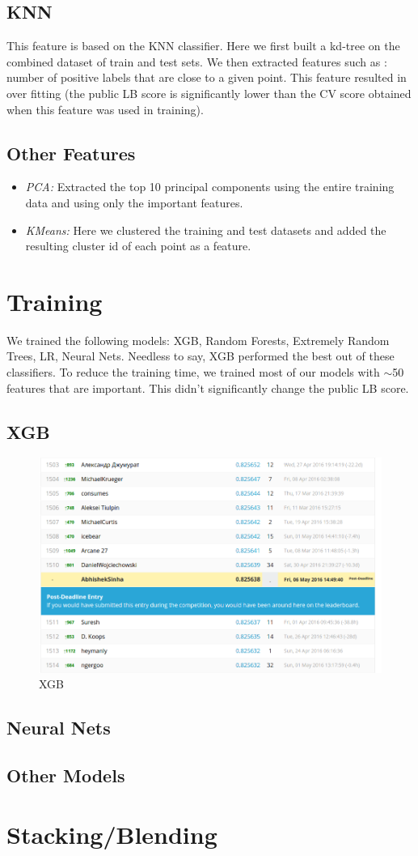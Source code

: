 \documentclass{article}
\begin{document}
\subsection{KNN}
This feature is based on the KNN classifier. Here we first built a kd-tree on the combined dataset of train and test sets. We then
extracted features such as : number of positive labels that are close to a given point. This feature resulted in over fitting (the public LB score is significantly lower than the CV score obtained when this feature was used in training).
\subsection{Other Features}
\begin{itemize}
\item \textit{PCA:} Extracted the top 10 principal components using the entire training data and using only the important features.
\item \textit{KMeans:} Here we clustered the training and test datasets and added the resulting cluster id of each point as a feature.
\end{itemize}
\section{Training}
We trained the following models: XGB, Random Forests, Extremely Random Trees, LR, Neural Nets. Needless to say, XGB performed the best out of these classifiers. To reduce the training time, we trained most of our models with $\sim$50 features that are important. This didn't significantly change the public LB score.
\subsection{XGB}
\begin{figure}[tbh]
\includegraphics[scale = 0.4]{xgb}
\caption{XGB}
\label{4a}
\end{figure}
\subsection{Neural Nets}
\subsection{Other Models}
\section{Stacking/Blending}
\end{document}
